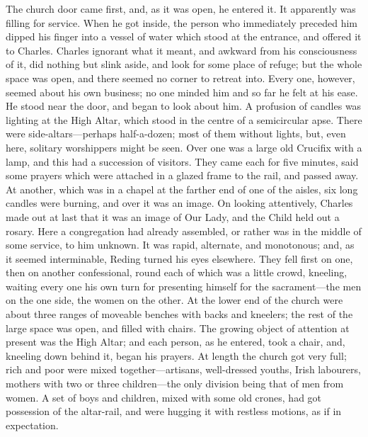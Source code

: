 The church door came first, and, as it was open, he entered it. It
apparently was filling for service. When he got inside, the person who
immediately preceded him dipped his finger into a vessel of water
which stood at the entrance, and offered it to Charles. Charles
ignorant what it meant, and awkward from his consciousness of it, did
nothing but slink aside, and look for some place of refuge; but the
whole space was open, and there seemed no corner to retreat into.
Every one, however, seemed about his own business; no one minded him
and so far he felt at his ease. He stood near the door, and began to
look about him. A profusion of candles was lighting at the High Altar,
which stood in the centre of a semicircular apse. There were
side-altars—perhaps half-a-dozen; most of them without lights,
but, even here, solitary worshippers might be seen. Over one was a
large old Crucifix with a lamp, and this had a succession of visitors.
They came each for five minutes, said some prayers which were attached
in a glazed frame to the rail, and passed away. At another, which was
in a chapel at the farther end of one of the aisles, six long candles
were burning, and over it was an image. On looking attentively,
Charles made out at last that it was an image of Our Lady, and the
Child held out a rosary. Here a congregation had already assembled, or
rather was in the middle of some service, to him unknown. It was
rapid, alternate, and monotonous; and, as it seemed interminable,
Reding turned his eyes elsewhere. They fell first on one, then on
another confessional, round each of which was a little crowd,
kneeling, waiting every one his own turn for presenting himself for
the sacrament—the men on the one side, the women on the other. At
the lower end of the church were about three ranges of moveable
benches with backs and kneelers; the rest of the large space was open,
and filled with chairs. The growing object of attention at present was
the High Altar; and each person, as he entered, took a chair, and,
kneeling down behind it, began his prayers. At length the church got
very full; rich and poor were mixed together—artisans, well-dressed
youths, Irish labourers, mothers with two or three children—the only
division being that of men from women. A set of boys and children,
mixed with some old crones, had got possession of the altar-rail, and
were hugging it with restless motions, as if in expectation.

